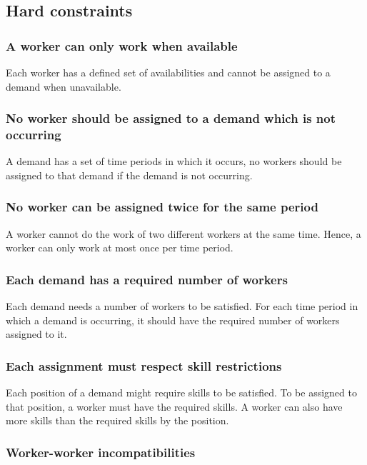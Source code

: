 \documentclass[../thesis.tex]{subfiles}
\begin{document}
\subsection{Hard constraints}

\subsubsection{A worker can only work when available}

Each worker has a defined set of availabilities and cannot be assigned to a demand when 
unavailable.

\subsubsection{No worker should be assigned to a demand which is not occurring}

A demand has a set of time periods in which it occurs,
no workers should be assigned to that demand if the demand is not 
occurring.

\subsubsection{No worker can be assigned twice for the same period} 
A worker cannot do the work of two different workers at the same time.
Hence, a worker can only work at most once per time period.

\subsubsection{Each demand has a required number of workers}

Each demand needs a number of workers to be satisfied. 
For each time period in which a demand is occurring, it should have the required 
number of workers assigned to it.

\subsubsection{Each assignment must respect skill restrictions}

Each position of a demand might require skills to be satisfied. 
To be assigned to that position, a worker must have the required skills. 
A worker can also have more skills than the required skills by the position.

\subsubsection{Worker-worker incompatibilities}
\end{document}
